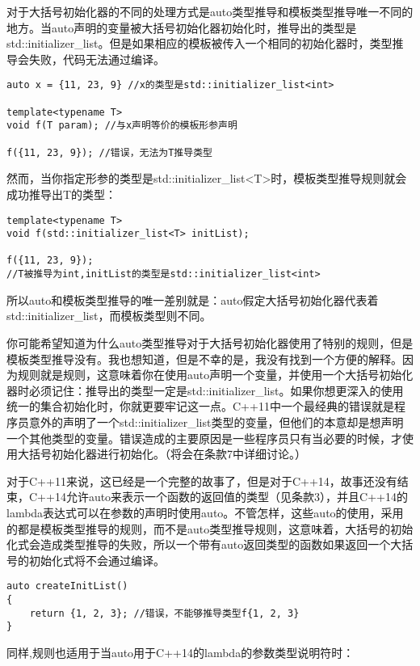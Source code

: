 对于大括号初始化器的不同的处理方式是auto类型推导和模板类型推导唯一不同的地方。当auto声明的变量被大括号初始化器初始化时，推导出的类型是std::initializer\_list。但是如果相应的模板被传入一个相同的初始化器时，类型推导会失败，代码无法通过编译。

\begin{lstlisting}
auto x = {11, 23, 9} //x的类型是std::initializer_list<int>

template<typename T>
void f(T param); //与x声明等价的模板形参声明

f({11, 23, 9}); //错误，无法为T推导类型
\end{lstlisting}

然而，当你指定形参的类型是std::initializer\_list<T>时，模板类型推导规则就会成功推导出T的类型：

\begin{lstlisting}
template<typename T>
void f(std::initializer_list<T> initList);

f({11, 23, 9}); 
//T被推导为int,initList的类型是std::initializer_list<int>
\end{lstlisting}

所以auto和模板类型推导的唯一差别就是：auto假定大括号初始化器代表着std::initializer\_list，而模板类型则不同。

你可能希望知道为什么auto类型推导对于大括号初始化器使用了特别的规则，但是模板类型推导没有。我也想知道，但是不幸的是，我没有找到一个方便的解释。因为规则就是规则，这意味着你在使用auto声明一个变量，并使用一个大括号初始化器时必须记住：推导出的类型一定是std::initializer\_list。如果你想更深入的使用统一的集合初始化时，你就更要牢记这一点。C++11中一个最经典的错误就是程序员意外的声明了一个std::initializer\_list类型的变量，但他们的本意却是想声明一个其他类型的变量。错误造成的主要原因是一些程序员只有当必要的时候，才使用大括号初始化器进行初始化。（将会在条款7中详细讨论。）

对于C++11来说，这已经是一个完整的故事了，但是对于C++14，故事还没有结束，C++14允许auto来表示一个函数的返回值的类型（见条款3），并且C++14的lambda表达式可以在参数的声明时使用auto。不管怎样，这些auto的使用，采用的都是模板类型推导的规则，而不是auto类型推导规则，这意味着，大括号的初始化式会造成类型推导的失败，所以一个带有auto返回类型的函数如果返回一个大括号的初始化式将不会通过编译。

\begin{lstlisting}
auto createInitList() 
{
	return {1, 2, 3}; //错误，不能够推导类型f{1, 2, 3}
}
\end{lstlisting}

同样,规则也适用于当auto用于C++14的lambda的参数类型说明符时：

